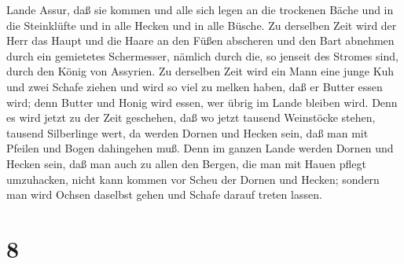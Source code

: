 Lande Assur,  daß sie kommen und alle sich legen an die
trockenen Bäche und in die Steinklüfte und in alle Hecken und in alle
Büsche.  Zu derselben Zeit wird der Herr das Haupt und die
Haare an den Füßen abscheren und den Bart abnehmen durch ein gemietetes
Schermesser, nämlich durch die, so jenseit des Stromes sind, durch den
König von Assyrien.  Zu derselben Zeit wird ein Mann eine
junge Kuh und zwei Schafe ziehen  und wird so viel zu
melken haben, daß er Butter essen wird; denn Butter und Honig wird
essen, wer übrig im Lande bleiben wird.  Denn es wird jetzt
zu der Zeit geschehen, daß wo jetzt tausend Weinstöcke stehen, tausend
Silberlinge wert, da werden Dornen und Hecken sein,  daß
man mit Pfeilen und Bogen dahingehen muß. Denn im ganzen Lande werden
Dornen und Hecken sein,  daß man auch zu allen den Bergen,
die man mit Hauen pflegt umzuhacken, nicht kann kommen vor Scheu der
Dornen und Hecken; sondern man wird Ochsen daselbst gehen und Schafe
darauf treten lassen.

\hypertarget{section-7}{%
\section{8}\label{section-7}}

